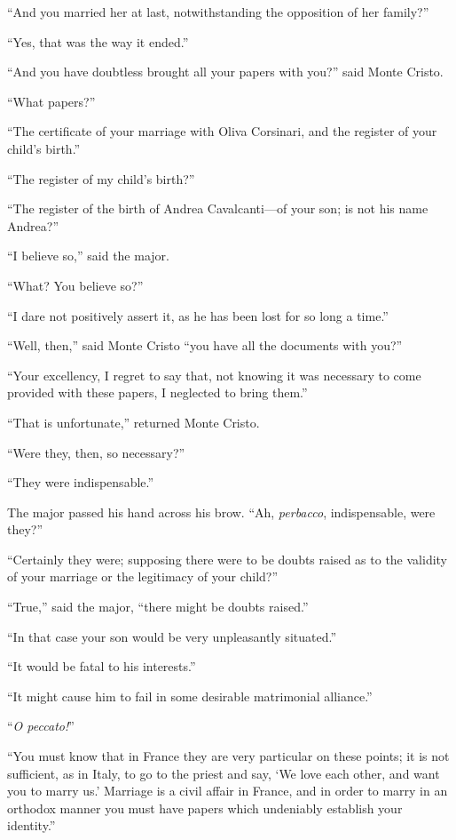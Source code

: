 “And you married her at last, notwithstanding the opposition of her
family?”

“Yes, that was the way it ended.”

“And you have doubtless brought all your papers with you?” said Monte
Cristo.

“What papers?”

“The certificate of your marriage with Oliva Corsinari, and the
register of your child’s birth.”

“The register of my child’s birth?”

“The register of the birth of Andrea Cavalcanti—of your son; is not his
name Andrea?”

“I believe so,” said the major.

“What? You believe so?”

“I dare not positively assert it, as he has been lost for so long a
time.”

“Well, then,” said Monte Cristo “you have all the documents with you?”

“Your excellency, I regret to say that, not knowing it was necessary to
come provided with these papers, I neglected to bring them.”

“That is unfortunate,” returned Monte Cristo.

“Were they, then, so necessary?”

“They were indispensable.”

The major passed his hand across his brow. “Ah, \textit{perbacco},
indispensable, were they?”

“Certainly they were; supposing there were to be doubts raised as to
the validity of your marriage or the legitimacy of your child?”

“True,” said the major, “there might be doubts raised.”

“In that case your son would be very unpleasantly situated.”

“It would be fatal to his interests.”

“It might cause him to fail in some desirable matrimonial alliance.”

“\textit{O peccato!}”

“You must know that in France they are very particular on these points;
it is not sufficient, as in Italy, to go to the priest and say, ‘We
love each other, and want you to marry us.’ Marriage is a civil affair
in France, and in order to marry in an orthodox manner you must have
papers which undeniably establish your identity.”

